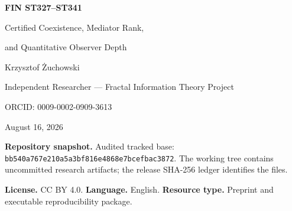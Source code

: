 \documentclass[11pt,a4paper]{article}
\begin{document}
\hypersetup{pageanchor=false}
\begin{titlepage}\centering
\vspace*{1cm}{\Large Fractal Information Theory Project\par}\vspace{.85cm}
{\huge\bfseries FIN ST327--ST341\par}\vspace{.35cm}
{\LARGE Certified Coexistence, Mediator Rank,\par}{\LARGE and Quantitative Observer Depth\par}
\vspace{.9cm}{\large Analytical, interval, and bounded computational research report\par}
\vfill{\Large Krzysztof \.{Z}uchowski\par}\vspace{.2cm}
{\large Independent Researcher --- Fractal Information Theory Project\par}{\large ORCID: 0009-0002-0909-3613\par}\vspace{.75cm}
{\large August 16, 2026\par}\vspace{.25cm}{\large Release 10.79\par}\vfill
\begin{minipage}{.92\textwidth}\small
\textbf{Repository snapshot.} Audited tracked base:
\texttt{bb540a767e210a5a3bf816e4868e7bcefbac3872}. The working tree contains uncommitted research artifacts; the release SHA-256 ledger identifies the files.

\medskip\textbf{License.} CC BY 4.0. \quad \textbf{Language.} English. \quad \textbf{Resource type.} Preprint and executable reproducibility package.
\end{minipage}\end{titlepage}
\hypersetup{pageanchor=true}
\end{document}
